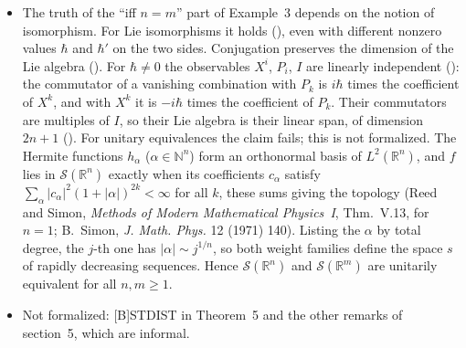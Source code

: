\documentclass[11pt]{article}
\begin{document}
\begin{itemize}
  () is a linear bijection $U\colon V \to W$ that preserves the inner product
  and carries the topology of $W$ to that of $V$. Conjugation $A \mapsto U A U^{-1}$ is then a
  bijection of the observables (), $U$ induces a
  homeomorphism of the pure states (), and the Born rule is
  preserved with the inner product. Along any $U$ that preserves the inner product, the topology
  of $W$ pulls back to the topology on $V$ with defining observables $U^{-1} Y_j U$
  (). So $U$ is a unitary equivalence if and only if the
  $U^{-1} Y_j U$ are continuous on $V$ and the $U X_i U^{-1}$ are continuous on $W$
  (); for $U = \mathrm{id}$ this is the frame condition above. A
  \emph{Lie isomorphism} () is a linear bijection that preserves the inner product
  and whose conjugation maps the complex Lie algebra spanned by the $X_i$ (),
  with the commutator as bracket, onto that spanned by the $Y_j$. This is the brief's
  ``preserve the Lie algebraic structure''. Every Lie isomorphism is a unitary equivalence
  (): the two Lie algebras generate conjugate associative algebras,
  hence the same topology.
\item The truth of the ``iff $n = m$'' part of Example~3 depends on the notion of isomorphism.
  For Lie isomorphisms it holds (), even with different
  nonzero values $\hbar$ and $\hbar'$ on the two sides. Conjugation preserves the dimension of
  the Lie algebra (). For $\hbar \ne 0$ the observables $X^i$,
  $P_i$, $I$ are linearly independent (): the commutator of a
  vanishing combination with $P_k$ is $i\hbar$ times the coefficient of $X^k$, and with $X^k$
  it is $-i\hbar$ times the coefficient of $P_k$. Their commutators are multiples of $I$, so
  their Lie algebra is their linear span, of dimension $2n + 1$
  (). For unitary equivalences the claim fails; this is not
  formalized. The Hermite functions $h_\alpha$
  ($\alpha \in \mathbb{N}^n$) form an orthonormal basis of $L^2(\mathbb{R}^n)$, and $f$ lies in
  $\mathcal{S}(\mathbb{R}^n)$ exactly when its coefficients $c_\alpha$ satisfy
  $\sum_\alpha |c_\alpha|^2 (1 + |\alpha|)^{2k} < \infty$ for all $k$, these sums giving the
  topology (Reed and Simon, \emph{Methods of Modern Mathematical Physics~I}, Thm.~V.13, for
  $n = 1$; B.~Simon, \emph{J. Math. Phys.} 12 (1971) 140). Listing the $\alpha$ by total degree,
  the $j$-th one has $|\alpha| \sim j^{1/n}$, so both weight families define the space $s$ of
  rapidly decreasing sequences. Hence $\mathcal{S}(\mathbb{R}^n)$ and
  $\mathcal{S}(\mathbb{R}^m)$ are unitarily equivalent for all $n, m \ge 1$.
\item Not formalized: [B]STDIST in Theorem~5 and the other remarks of section~5, which are
  informal.
\end{itemize}
\end{document}
